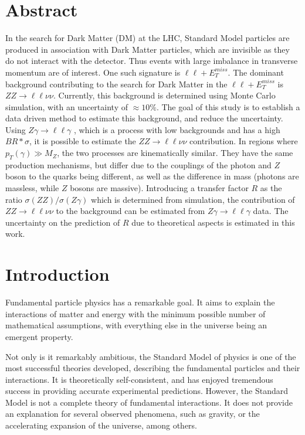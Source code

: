 \documentclass[12pt,a4paper,openright,twoside]{report}
\newcommand{\ZZ}{$ZZ\to \ell\ell\nu\nu$ }
\newcommand{\Zg}{$Z\gamma\to \ell\ell\gamma$ }
\newcommand\blankpage{%
    \null
    \thispagestyle{empty}%
    \addtocounter{page}{-1}%
    \newpage}
\begin{document}
\newpage
\blankpage
\newpage

\chapter*{Abstract}
\thispagestyle{plain}
\setcounter{page}{1}
In the search for Dark Matter (DM) at the LHC, Standard Model particles are produced in association with Dark Matter particles, which are invisible as they do not interact with the detector. Thus events with large imbalance in transverse momentum are of interest. One such signature is $\ell\ell + E_T^{miss}$. The dominant background contributing to the search for Dark Matter in the $\ell\ell + E_T^{miss}$ is $ZZ \rightarrow \ell\ell\nu\nu$.  Currently, this background is determined using Monte Carlo simulation, with an uncertainty of $\approx 10\%$. The goal of this study is to establish a data driven method to estimate this background, and reduce the uncertainty. Using \Zg, which is a process with low backgrounds and has a high $BR*\sigma$, it is possible to estimate the \ZZ contribution. In regions where $p_{T}(\gamma) \gg M_{Z}$, the two processes are kinematically similar. They have the same production mechanisms, but differ due to the couplings of the photon and $Z$ boson to the quarks being different, as well as the difference in mass (photons are massless, while $Z$ bosons are massive). Introducing a transfer factor $R$ as the ratio $\sigma(ZZ)/\sigma(Z\gamma)$ which is determined from simulation, the contribution of \ZZ to the background can be estimated from \Zg data. The uncertainty on the prediction of $R$ due to theoretical aspects is estimated in this work.
\cleardoublepage

\tableofcontents
\cleardoublepage

\listoffigures
\listofmyequations
\listoftables
\cleardoublepage

\linenumbers
\chapter{Introduction}
\pagestyle{plain}
\setcounter{page}{1}
Fundamental particle physics has a remarkable goal. It aims to explain the interactions of matter and energy with the minimum possible number of mathematical assumptions, with everything else in the universe being an emergent property.

Not only is it remarkably ambitious, the Standard Model of physics is one of the most successful theories developed, describing the fundamental particles and their interactions\cite{griff}. It is theoretically self-consistent, and has enjoyed tremendous success in providing accurate experimental predictions. However, the Standard Model is not a complete theory of fundamental interactions. It does not provide an explanation for several observed phenomena, such as gravity, or the accelerating expansion of the universe, among others.
\end{document}
